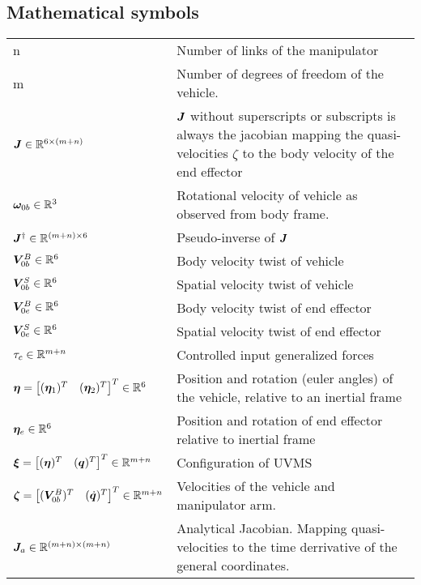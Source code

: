 \subsection*{Mathematical symbols}
    \begin{longtable}{p{6cm}p{10cm}}
			n & Number of links of the manipulator \\
			m & Number of degrees of freedom of the vehicle.  \\
			$\boldsymbol J \in \mathbb{R}^{6\times (m+n)}$ & $\boldsymbol J$ without superscripts or subscripts is always the jacobian mapping the quasi-velocities $\zeta$ to the body velocity of the end effector\\
			$\boldsymbol \omega_{0b} \in \mathbb{R}^{3}$ & Rotational velocity of vehicle as observed from body frame.  \\
			$\boldsymbol J^{\dagger} \in \mathbb{R}^{(m+n) \times 6}$ & Pseudo-inverse of $\boldsymbol J$\\
			$\boldsymbol V_{0b}^{B} \in \mathbb{R}^{6}  $ & Body velocity twist of vehicle\\
			$\boldsymbol V_{0b}^{S}\in \mathbb{R}^{6} $ & Spatial velocity twist of vehicle\\
			$\boldsymbol V_{0e}^{B}\in \mathbb{R}^{6} $ & Body velocity twist of end effector\\
			$\boldsymbol V_{0e}^{S}\in \mathbb{R}^{6} $ & Spatial velocity twist of end effector\\
			$\tau_{c} \in \mathbb{R}^{m+n}$ & Controlled input generalized forces\\
			$\boldsymbol \eta = \begin{bmatrix} (\boldsymbol \eta_{1})^{T} & (\boldsymbol \eta_{2})^{T}\end{bmatrix}^{T} \in \mathbb{R}^{6}$  & Position and rotation (euler angles) of the vehicle, relative to an inertial frame \\
			$\boldsymbol \eta_{e} \in \mathbb{R}^{6}$ & Position and rotation of end effector relative to inertial frame \\ 
			$\boldsymbol \xi = \begin{bmatrix} (\boldsymbol \eta)^{T} & (\boldsymbol q)^{T}\end{bmatrix}^{T} \in \mathbb{R}^{m+n} $ &  Configuration of UVMS \\
			$\boldsymbol \zeta = \begin{bmatrix} (\boldsymbol V_{0b}^B)^{T} & (\dot{\boldsymbol q})^{T}\end{bmatrix}^{T} \in \mathbb{R}^{m+n}$ & Velocities of the vehicle and manipulator arm. \\
			$\boldsymbol J_{a} \in \mathbb{R}^{(m+n) \times (m+n)} $ & Analytical Jacobian. Mapping quasi-velocities to the time derrivative of the general coordinates. \\

\end{longtable}
